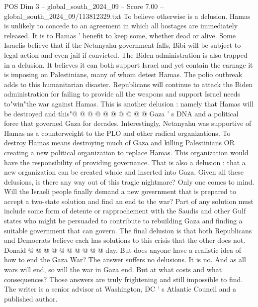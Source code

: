 \begin{textsample}{POS Dim 3 – global\_south\_2024\_09 – Score 7.00 – global\_south\_2024\_09/113812329.txt}
To believe otherwise is a delusion.
Hamas is unlikely to concede to an agreement in which all hostages are immediately released.
It is to Hamas ' benefit to keep some, whether dead or alive.
Some Israelis believe that if the Netanyahu government falls, Bibi will be subject to legal action and even jail if convicted.
The Biden administration is also trapped in a delusion.
It believes it can both support Israel and yet contain the carnage it is imposing on Palestinians, many of whom detest Hamas.
The polio outbreak adds to this humanitarian disaster.
Republicans will continue to attack the Biden administration for failing to provide all the weapons and support Israel needs to"win"the war against Hamas.
This is another delusion : namely that Hamas will be destroyed and this"@ @ @ @ @ @ @ @ @ @ Gaza ' s DNA and a political force that governed Gaza for decades.
Interestingly, Netanyahu was supportive of Hamas as a counterweight to the PLO and other radical organizations.
To destroy Hamas means destroying much of Gaza and killing Palestinians OR creating a new political organization to replace Hamas.
This organization would have the responsibility of providing governance.
That is also a delusion : that a new organization can be created whole and inserted into Gaza.
Given all these delusions, is there any way out of this tragic nightmare?
Only one comes to mind.
Will the Israeli people finally demand a new government that is prepared to accept a two-state solution and find an end to the war?
Part of any solution must include some form of detente or rapprochement with the Saudis and other Gulf states who might be persuaded to contribute to rebuilding Gaza and finding a suitable government that can govern.
The final delusion is that both Republicans and Democrats believe each has solutions to this crisis that the other does not.
Donald @ @ @ @ @ @ @ @ @ @ day.
But does anyone have a realistic idea of how to end the Gaza War?
The answer suffers no delusions.
It is no.
And as all wars will end, so will the war in Gaza end.
But at what costs and what consequences?
Those answers are truly frightening and still impossible to find.
The writer is a senior advisor at Washington, DC ' s Atlantic Council and a published author.

\end{textsample}
